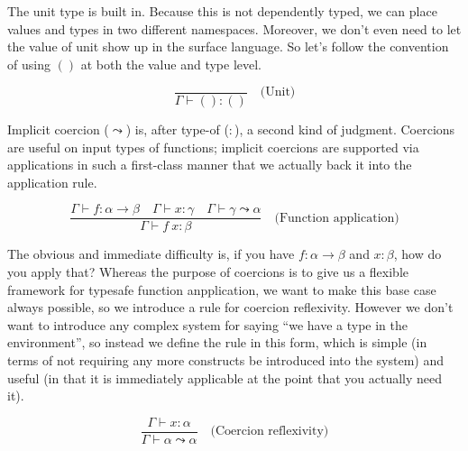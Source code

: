 \documentclass{article}
\begin{document}
The unit type is built in. Because this is not dependently typed, we can place
values and types in two different namespaces. Moreover, we don't even need to
let the value of unit show up in the surface language. So let's follow the
convention of using $()$ at both the value and type level.

\[ \frac{}{\Gamma\vdash()\mathbin{:}()}\quad\text{(Unit)} \]

Implicit coercion ($\leadsto$) is, after type-of ($:$), a second kind of
judgment. Coercions are useful on input types of functions; implicit coercions
are supported via applications in such a first-class manner that we actually
back it into the application rule.

\[ \frac{\Gamma\vdash f\mathbin{:}\alpha\to\beta\quad\Gamma\vdash x\mathbin{:}\gamma\quad\Gamma\vdash \gamma\leadsto\alpha}{\Gamma\vdash f~x\mathbin{:}\beta}\quad\text{(Function application)} \]

The obvious and immediate difficulty is, if you have
$f\mathbin{:}\alpha\to\beta$ and $x\mathbin{:}\beta$, how do you apply that?
Whereas the purpose of coercions is to give us a flexible framework for typesafe
function anpplication, we want to make this base case always possible, so we
introduce a rule for coercion reflexivity. However we don't want to introduce
any complex system for saying ``we have a type in the environment'', so instead
we define the rule in this form, which is simple (in terms of not requiring any
more constructs be introduced into the system) and useful (in that it is
immediately applicable at the point that you actually need it).

\[ \frac{\Gamma\vdash x\mathbin{:}\alpha}{\Gamma\vdash \alpha\leadsto\alpha}\quad\text{(Coercion reflexivity)} \]

\end{document}
